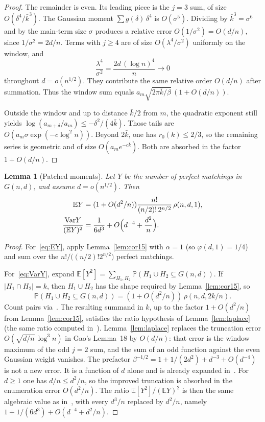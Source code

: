 \documentclass[11pt]{article}
\newtheorem{lemma}[theorem]{Lemma}
\newcommand{\Gnd}{G(n,d)}
\newcommand{\EE}{\mathbb{E}}
\newcommand{\PP}{\mathbb{P}}
\newcommand{\Var}{\mathrm{Var}}
\begin{document}
\begin{proof}
The remainder is even. Its leading piece is the \(j=3\) sum, of size \(O(\delta^4/\bar k^3)\).
The Gaussian moment \(\sum g(\delta)\,\delta^4\) is \(O(\sigma^5)\). Dividing by \(\bar k^3=\sigma^6\)
and by the main-term size \(\sigma\) produces a relative error \(O(1/\sigma^2)=O(d/n)\),
since \(1/\sigma^2=2d/n\). Terms with \(j\ge 4\) are of size \(O(\lambda^4/\sigma^2)\) uniformly on the
window, and
\[
\frac{\lambda^4}{\sigma^2}
=
\frac{2d\,(\log n)^4}{n}\to 0
\]
throughout \(d=o(n^{1/2})\). They contribute the same relative order \(O(d/n)\) after summation.
Thus the window sum equals \(a_m\sqrt{2\pi\bar k/\beta}\,(1+O(d/n))\).

Outside the window and up to distance \(\bar k/2\) from \(m\), the quadratic exponent still yields
\(\log(a_{m+\delta}/a_m)\le-\delta^2/(4\bar k)\). Those tails are
\(O(a_m\sigma\exp(-c\log^2 n))\). Beyond \(2\bar k\), one has \(r_0(k)\le 2/3\), so the
remaining series is geometric and of size \(O(a_m e^{-c\bar k})\). Both are absorbed in
the factor \(1+O(d/n)\).
\end{proof}

\begin{lemma}[Patched moments]
\label{lem:moments}
Let \(Y\) be the number of perfect matchings in \(\Gnd\), and assume \(d=o(n^{1/2})\).
Then
\begin{align}
\label{eq:EY}
\EE Y
&=(1+O(d^2/n))\frac{n!}{(n/2)!\,2^{n/2}}\,\rho(n,d,1),\\
\label{eq:VarY}
\frac{\Var Y}{(\EE Y)^2}
&=\frac1{6d^3}+O\Bigl(d^{-4}+\frac{d^2}{n}\Bigr).
\end{align}
\end{lemma}

\begin{proof}
For~\eqref{eq:EY}, apply Lemma~\ref{lem:cor15} with \(\alpha=1\)
(so \(\varphi(d,1)=1/4\)) and sum over the \(n!/\bigl((n/2)!2^{n/2}\bigr)\) perfect
matchings.

For~\eqref{eq:VarY}, expand \(\EE[Y^2]=\sum_{H_1,H_2}\PP(H_1\cup H_2\subseteq\Gnd)\).
If \(|H_1\cap H_2|=k\), then \(H_1\cup H_2\) has the shape required by
Lemma~\ref{lem:cor15}, so
\[
\PP(H_1\cup H_2\subseteq\Gnd)=(1+O(d^2/n))\,\rho(n,d,2k/n).
\]
Count pairs via~\cite[Lemma~17]{Gao21}. The resulting summand in \(k\), up to the factor
\(1+O(d^2/n)\) from Lemma~\ref{lem:cor15}, satisfies the ratio hypothesis of
Lemma~\ref{lem:laplace} (the same ratio computed in~\cite[§3.4.2]{Gao21}).
Lemma~\ref{lem:laplace} replaces the truncation error \(O(\sqrt{d/n}\,\log^3 n)\) in Gao's
Lemma~18 by \(O(d/n)\): that error is the window maximum of the odd \(j=2\) sum, and the sum of
an odd function against the even Gaussian weight vanishes.
The prefactor \(\beta^{-1/2}=1+1/(2d^2)+d^{-3}+O(d^{-4})\) is not a new error.
It is a function of \(d\) alone and is already expanded in~\cite[§3.4.1]{Gao21}.
For \(d\ge 1\) one has \(d/n\le d^2/n\), so the improved truncation is absorbed
in the enumeration error \(O(d^2/n)\).
The ratio \(\EE[Y^2]/(\EE Y)^2\) is then the same algebraic value as
in~\cite[§3.4.1]{Gao21}, with every \(d^3/n\) replaced by \(d^2/n\), namely
\(1+1/(6d^3)+O(d^{-4}+d^2/n)\).
\end{proof}
\end{document}

